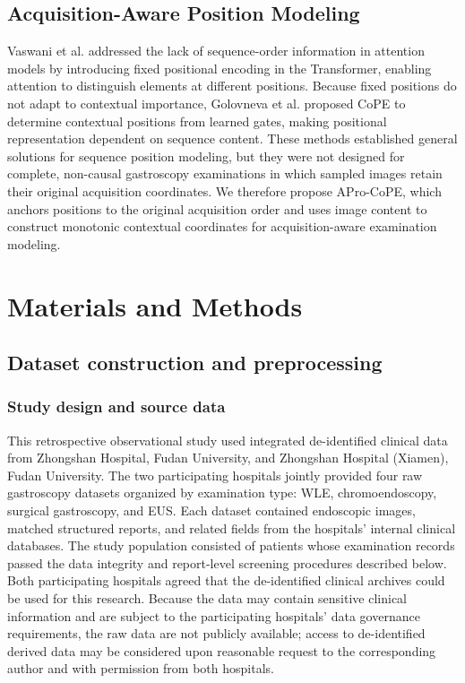 \documentclass[Afour,sagev,times]{sagej}
\begin{document}
\subsection{Acquisition-Aware Position Modeling}

Vaswani et al. addressed the lack of sequence-order information in attention models by introducing fixed positional encoding in the Transformer, enabling attention to distinguish elements at different positions.\cite{R26} Because fixed positions do not adapt to contextual importance, Golovneva et al. proposed CoPE to determine contextual positions from learned gates, making positional representation dependent on sequence content.\cite{R27} These methods established general solutions for sequence position modeling, but they were not designed for complete, non-causal gastroscopy examinations in which sampled images retain their original acquisition coordinates. We therefore propose APro-CoPE, which anchors positions to the original acquisition order and uses image content to construct monotonic contextual coordinates for acquisition-aware examination modeling.

\section{Materials and Methods}

\subsection{Dataset construction and preprocessing}

\subsubsection{Study design and source data}

This retrospective observational study used integrated de-identified clinical data from Zhongshan Hospital, Fudan University, and Zhongshan Hospital (Xiamen), Fudan University. The two participating hospitals jointly provided four raw gastroscopy datasets organized by examination type: WLE, chromoendoscopy, surgical gastroscopy, and EUS. Each dataset contained endoscopic images, matched structured reports, and related fields from the hospitals' internal clinical databases. The study population consisted of patients whose examination records passed the data integrity and report-level screening procedures described below. Both participating hospitals agreed that the de-identified clinical archives could be used for this research. Because the data may contain sensitive clinical information and are subject to the participating hospitals' data governance requirements, the raw data are not publicly available; access to de-identified derived data may be considered upon reasonable request to the corresponding author and with permission from both hospitals.
\end{document}

